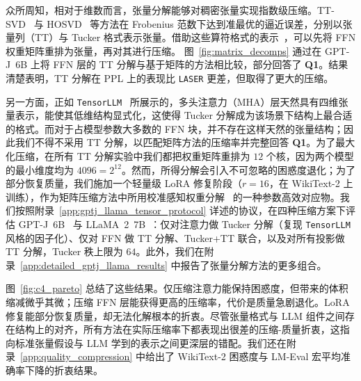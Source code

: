 众所周知，相对于维数而言，张量分解能够对稠密张量实现指数级压缩。TT-SVD~\citep{oseledets2011tensor} 与 HOSVD~\citep{hosvdopt} 等方法在 Frobenius 范数下达到准最优的逼近误差，分别以张量列（TT）与 Tucker 格式表示张量。借助这些算符格式的表示~\citep{tyrtyshnikov2003tensor, hackbusch2006low, oseledets2011tensor}，可以先将 FFN 权重矩阵重排为张量，再对其进行压缩。
图~\ref{fig:matrix_decomps} 通过在 GPT-J~6B 上将 FFN 层的 TT 分解与基于矩阵的方法相比较，部分回答了 \textbf{Q1}。结果清楚表明，TT 分解在 PPL 上的表现比 \texttt{LASER} 更差，但取得了更大的压缩。

另一方面，正如 \texttt{TensorLLM}~\citep{tensorllm2025} 所展示的，多头注意力（MHA）层天然具有四维张量表示，能使其低维结构显式化，这使得 Tucker 分解成为该场景下结构上最合适的格式。而对于占模型参数大多数的 FFN 块，并不存在这样天然的张量结构；因此我们不得不采用 TT 分解，以匹配矩阵方法的压缩率并完整回答 \textbf{Q1}。为了最大化压缩，在所有 TT 分解实验中我们都把权重矩阵重排为 $12$ 个核，因为两个模型的最小维度均为 $4096 = 2^{12}$。然而，所得分解会引入不可忽略的困惑度退化；为了部分恢复质量，我们施加一个轻量级 LoRA 修复阶段（$r=16$，在 WikiText-2 上训练），作为矩阵压缩方法中所用校准感知权重分解~\citep{wang2025dobisvd,svdllm2025} 的一种参数高效对应物。我们按照附录~\ref{app:gptj_llama_tensor_protocol} 详述的协议，在四种压缩方案下评估 GPT-J~6B~\citep{gpt-j} 与 LLaMA~2~7B~\citep{touvron2023llama}：仅对注意力做 Tucker 分解（复现 \texttt{TensorLLM} 风格的因子化）、仅对 FFN 做 TT 分解、Tucker+TT 联合，以及对所有投影做 TT 分解，Tucker 秩上限为 $64$。此外，我们在附录~\ref{app:detailed_gptj_llama_results} 中报告了张量分解方法的更多组合。





图~\ref{fig:c4_pareto} 总结了这些结果。仅压缩注意力能保持困惑度，但带来的体积缩减微乎其微；压缩 FFN 层能获得更高的压缩率，代价是质量急剧退化。LoRA 修复能部分恢复质量，却无法化解根本的折衷。尽管张量格式与 LLM 组件之间存在结构上的对齐，所有方法在实际压缩率下都表现出很差的压缩-质量折衷，这指向标准张量假设与 LLM 学到的表示之间更深层的错配。我们还在附录~\ref{app:quality_compression} 中给出了 WikiText-2 困惑度与 LM-Eval 宏平均准确率下降的折衷结果。


